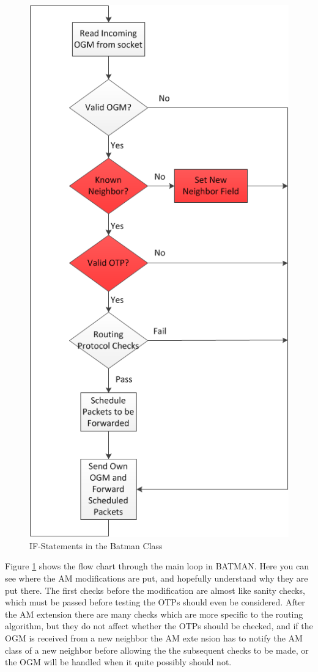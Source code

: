 \begin{figure}[h!]
	\centering
	\includegraphics[totalheight=1\textheight]{images/batman_if_statements.png}
	\caption{IF-Statements in the Batman Class}
	\label{fig:batman_if_statements}
\end{figure}

Figure \ref{fig:batman_if_statements} shows the flow chart through the main loop
in BATMAN. Here you can see where the AM modifications are put, and hopefully
understand why they are put there. The first checks before the modification are
almost like sanity checks, which must be passed before testing the \acp{OTP}
should even be considered. After the AM extension there are many checks which
are more specific to the routing algorithm, but they do not affect whether the
\acp{OTP} should be checked, and if the OGM is received from a new neighbor the
AM exte nsion has to notify the AM class of a new neighbor before allowing the
the subsequent checks to be made, or the OGM will be handled when it quite
possibly should not.

